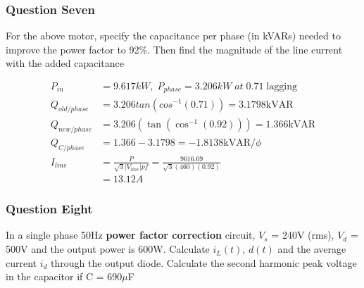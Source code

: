 \documentclass[a4paper,11pt]{article}
\begin{document}
\newpage
\subsubsection*{Question Seven}
For the above motor, specify the capacitance per phase (in kVARs) needed to improve the power factor to 92\%. Then find the magnitude of the line current with the added capacitance

\begin{align*}
    P_{in}        & = 9.617kW,\; P_{phase}=3.206kW\;at\;0.71\;\mathrm{lagging}                            \\
    Q_{old/phase} & = 3.206tan(cos^{-1}(0.71)) = 3.1798 \mathrm{kVAR}                                     \\
    Q_{new/phase} & = 3.206\left(\tan\left(\cos^{-1}\left(0.92\right)\right)\right) = 1.366 \mathrm{kVAR} \\
    Q_{C/phase}   & = 1.366 - 3.1798=-1.8138 \mathrm{kVAR}/\phi                                           \\
    I_{line}      & = \frac{P}{\sqrt{3}|V_{line}|pf} = \frac{9616.69}{\sqrt{3}(460)(0.92)}                \\
                  & = 13.12 A
\end{align*}

\subsubsection*{Question Eight}
In a single phase 50Hz \textbf{power factor correction} circuit, $V_s$ = 240V (rms), $V_d$ = 500V and the output power is 600W. Calculate $i_L(t)$, $d(t)$ and the average current $i_d$ through the output diode. Calculate the second harmonic peak voltage in the capacitor if C = 690$\mu$F
\end{document}
